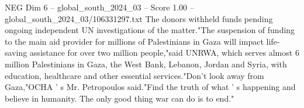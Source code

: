 \begin{textsample}{NEG Dim 6 – global\_south\_2024\_03 – Score 1.00 – global\_south\_2024\_03/106331297.txt}
The donors withheld funds pending ongoing independent UN investigations of the matter."The suspension of funding to the main aid provider for millions of Palestinians in Gaza will impact life-saving assistance for over two million people,"said UNRWA, which serves almost 6 million Palestinians in Gaza, the West Bank, Lebanon, Jordan and Syria, with education, healthcare and other essential services."Don't look away from Gaza,"OCHA ' s Mr.
Petropoulos said."Find the truth of what ' s happening and believe in humanity.
The only good thing war can do is to end."

\end{textsample}
